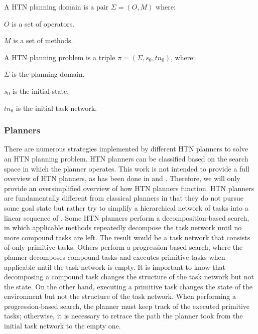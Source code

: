 \begin{Tdef}
    A  HTN planning domain is a pair $\Sigma= (O, M)$ where:
    \vspace{-0.5em}
    \begin{compactitem}
    \item 
    $O$ is a set of operators.
    \item 
    $M$ is a set of methods.
    \end{compactitem}
\end{Tdef}

\begin{Tdef}
    A HTN planning problem is a triple $\pi = (\Sigma,s_0,tn_0)$, where:
    \vspace{-0.5em}
    \begin{compactitem}
    \item 
    $\Sigma$ is the planning domain.
    \item 
    $s_0$ is the initial state.
    \item 
    $tn_0$ is the initial task network.
    \end{compactitem}
\end{Tdef}

\subsubsection{Planners}
There are numerous strategies implemented by different HTN planners to solve an HTN planning problem. HTN planners can be classified based on the search space in which the planner operates. This work is not intended to provide a full overview of HTN planners, as has been done in \cite{bercher_survey_2019} and \cite{OverviewHierarchicalTaskgeorgievski2014}. Therefore, we will only provide an oversimplified overview of how HTN planners function. HTN planners are fundamentally different from classical planners in that they do not pursue some goal state but rather try to simplify a hierarchical network of tasks into a linear sequence of . Some HTN planners perform a decomposition-based search, in which applicable methods repeatedly decompose the task network until no more compound tasks are left. The result would be a task network that consists of only primitive tasks. Others perform a progression-based search, where the planner decomposes compound tasks and executes primitive tasks when applicable until the task network is empty. It is important to know that decomposing a compound task changes the structure of the task network but not the state. On the other hand, executing a primitive task changes the state of the environment but not the structure of the task network. When performing a progression-based search, the planner must keep track of the executed primitive tasks; otherwise, it is necessary to retrace the path the planner took from the initial task network to the empty one.

